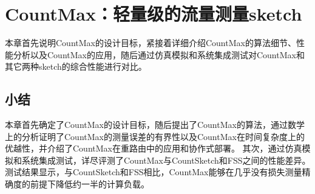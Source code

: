 % 

\chapter{CountMax：轻量级的流量测量sketch}\label{chap:countmax}
本章首先说明CountMax的设计目标，紧接着详细介绍CountMax的算法细节、性能分析以及CountMax的应用，随后通过仿真模拟和系统集成测试对CountMax和其它两种sketch的综合性能进行对比。





\section{小结}
本章首先确定了CountMax的设计目标，随后提出了CountMax的算法，通过数学上的分析证明了CountMax的测量误差的有界性以及CountMax在时间复杂度上的优越性，并介绍了CountMax在重路由中的应用和协作式部署。
其次，通过仿真模拟和系统集成测试，详尽评测了CountMax与CountSketch和FSS之间的性能差异。
测试结果显示，与CountSketch和FSS相比，CountMax能够在几乎没有损失测量精确度的前提下降低约一半的计算负载。